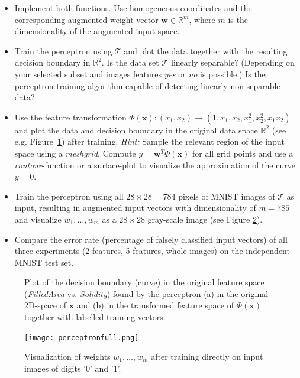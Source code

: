 \documentclass[a4]{article}
\begin{document}
\begin{itemize}
\item Implement both functions. Use homogeneous coordinates and the corresponding augmented weight vector ${\mathbf w}\in\mathbb{R}^{m}$, where $m$ is the dimensionality of the augmented input space.
\item Train the perceptron using $\mathcal{T}$ and plot the data together with the resulting decision boundary in $\mathbb{R}^2$. Is the data set $\mathcal{T}$ linearly separable? (Depending on your selected subset and images features \emph{yes} or \emph{no} is possible.) Is the perceptron training algorithm capable of detecting linearly non-separable data?
\item Use the feature transformation $\Phi(\mathbf{x}):(x_1,x_2) \rightarrow (1, x_1,x_2,x_1^2,x_2^2,x_1x_2)$ and plot the data and decision boundary in the original data space $\mathbb{R}^2$ (see e.g. Figure~\ref{fig:imagefeatures}) after training. \emph{Hint:} Sample the relevant region of the input space using a \emph{meshgrid}. Compute $y = {\mathbf w}^T\Phi({\mathbf x})$ for all grid points and use a \emph{contour}-function or a surface-plot to visualize the approximation of the curve $y = 0$.
\item Train the perceptron using all $28\times28 = 784$ pixels of MNIST images of $\mathcal{T}$ as input, resulting in augmented input vectors with dimensionality of $m = 785$ and visualize $w_1, \dots, w_m$ as a $28\times28$ gray-scale image (see Figure \ref{fig:nofeatures}).
\item Compare the error rate (percentage of falsely classified input vectors) of all three experiments (2 features, 5 features, whole images) on the independent MNIST test set.
\end{itemize}

\begin{figure}[!h]
\begin{center}
\centering
{}
\end{center}
\caption{\label{fig:imagefeatures}Plot of the decision boundary (curve) in the original feature space (\emph{FilledArea} vs. \emph{Solidity}) found by the perceptron (a) in the original 2D-space of $\mathbf{x}$  and  (b) in the transformed feature space of $\Phi(\mathbf{x})$  together with labelled training vectors.}
\end{figure}

\begin{figure}[!h]
\begin{center}
\centering
\texttt{[image: perceptronfull.png]}
\end{center}
\caption{\label{fig:nofeatures}Visualization of weights $w_1, \dots, w_m$ after training directly on input images of digits '0' and '1'.}
\end{figure}
\end{document}
